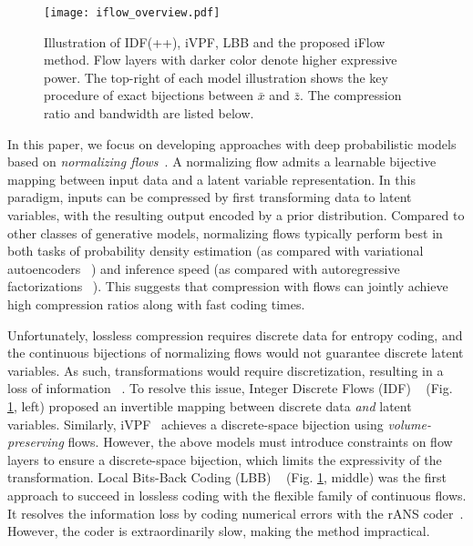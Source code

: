 \documentclass{article}
\newcommand{\quant}[1]{\bar{#1}}
\begin{document}
\begin{figure}[t]
\begin{center}
\texttt{[image: iflow\_overview.pdf]}\\
\end{center}
\caption{Illustration of IDF(++), iVPF, LBB and the proposed iFlow method. Flow layers with darker color denote higher expressive power. The top-right of each model illustration shows the key procedure of exact bijections between $\quant{x}$ and $\quant{z}$. The compression ratio and bandwidth are listed below.}
\label{fig:illustration}
\end{figure}





In this paper, we focus on developing approaches with deep probabilistic models based on \textit{normalizing flows}~\cite{dinh2016density,kingma2018glow,prenger2019waveglow,kumar2019videoflow,chen2020vflow,lippe2020categorical,kim2020softflow}. A normalizing flow admits a learnable bijective mapping between input data and a latent variable representation. In this paradigm, inputs can be compressed by first transforming data to latent variables, with the resulting output encoded by a prior distribution. Compared to other classes of generative models, normalizing flows typically perform best in both tasks of probability density estimation (as compared with variational autoencoders ~\cite{kingma2013auto,higgins2016beta,child2020very}) and inference speed (as compared with autoregressive factorizations ~\cite{salimans2017pixelcnn++,van2016conditional,jun2020distribution}). This suggests that compression with flows can jointly achieve high compression ratios along with fast coding times. 





Unfortunately, lossless compression requires discrete data for entropy coding, and the continuous bijections of normalizing flows would not guarantee discrete latent variables. As such, transformations would require discretization, resulting in a loss of information ~\cite{zhang2021ivpf,behrmann2020understanding}. To resolve this issue, Integer Discrete Flows (IDF) ~\cite{hoogeboom2019integer, berg2020idf++} (Fig. \ref{fig:illustration}, left) proposed an invertible mapping between discrete data \textit{and} latent variables. Similarly, iVPF~\cite{zhang2021ivpf} achieves a discrete-space bijection using \textit{volume-preserving} flows. However, the above models must introduce constraints on flow layers to ensure a discrete-space bijection, which limits the expressivity of the transformation. Local Bits-Back Coding (LBB) ~\cite{ho2019compression} (Fig. \ref{fig:illustration}, middle) was the first approach to succeed in lossless coding with the flexible family of continuous flows. It resolves the information loss by coding numerical errors with the rANS coder~\cite{duda2013asymmetric}. However, the coder is extraordinarily slow, making the method impractical.
\end{document}
